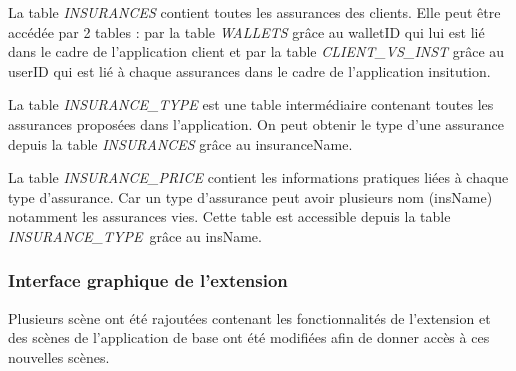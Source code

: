 \documentclass[../rapport.tex]{subfiles}
\begin{document}
		\medskip

		La table \textit{INSURANCES} contient toutes les assurances des clients. Elle peut être accédée par 2 tables : par la table \textit{WALLETS} grâce au walletID qui lui est lié dans le cadre de l'application client et par la table \textit{CLIENT\_VS\_INST} grâce au userID qui est lié à chaque assurances dans le cadre de l'application insitution.

		\medskip

		La table \textit{INSURANCE\_TYPE} est une table intermédiaire contenant toutes les assurances proposées dans l'application. On peut obtenir le type d'une assurance depuis la table \textit{INSURANCES} grâce au insuranceName.

		\medskip

		La table \textit{INSURANCE\_PRICE} contient les informations pratiques liées à chaque type d'assurance. Car un type d'assurance peut avoir plusieurs nom (insName) notamment les assurances vies. Cette table est accessible depuis la table \textit{INSURANCE\_TYPE} grâce au insName.

		\subsubsection{Interface graphique de l'extension}

		Plusieurs scène ont été rajoutées contenant les fonctionnalités de l'extension et des scènes de l'application de base ont été modifiées afin de donner accès à ces nouvelles scènes. 
\end{document}

